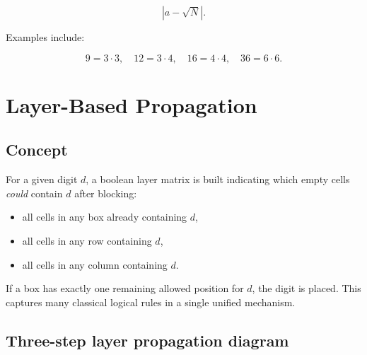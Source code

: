 \documentclass[11pt]{article}
\begin{document}
\[
|a - \sqrt{N}|.
\]


Examples include:


\[
9 = 3 \cdot 3,\quad 12 = 3 \cdot 4,\quad 16 = 4 \cdot 4,\quad 36 = 6 \cdot 6.
\]



\section{Layer-Based Propagation}

\subsection{Concept}
For a given digit $d$, a boolean layer matrix is built indicating which empty cells
\emph{could} contain $d$ after blocking:
\begin{itemize}
    \item all cells in any box already containing $d$,
    \item all cells in any row containing $d$,
    \item all cells in any column containing $d$.
\end{itemize}
If a box has exactly one remaining allowed position for $d$, the digit is placed.
This captures many classical logical rules in a single unified mechanism.

\subsection{Three-step layer propagation diagram}
\end{document}
